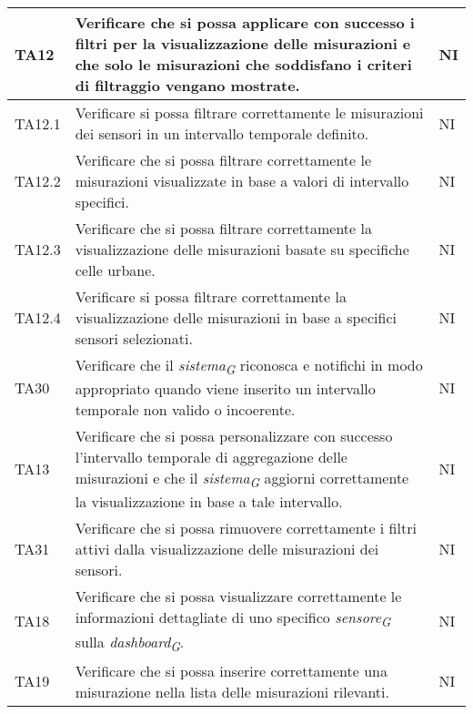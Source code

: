 \begin{longtable}{|C{1.9cm}|L{5cm}|C{2cm}|}
    TA12 & Verificare che si possa applicare con successo i filtri per la visualizzazione delle misurazioni e che solo le misurazioni che soddisfano i criteri di filtraggio vengano mostrate. & NI \\
    \hline
    
    TA12.1 & Verificare si possa filtrare correttamente le misurazioni dei sensori in un intervallo temporale definito. & NI \\
    \hline
    
    TA12.2 & Verificare che si possa filtrare correttamente le misurazioni visualizzate in base a valori di intervallo specifici. & NI \\
    \hline
    
    TA12.3 & Verificare che si possa filtrare correttamente la visualizzazione delle misurazioni basate su specifiche celle urbane. & NI \\
    \hline
    
    TA12.4 & Verificare si possa filtrare correttamente la visualizzazione delle misurazioni in base a specifici sensori selezionati. & NI \\
    \hline
    
    TA30 & Verificare che il \textit{sistema}\textsubscript{\textit{G}} riconosca e notifichi in modo appropriato quando viene inserito un intervallo temporale non valido o incoerente. & NI \\
    \hline
    
    TA13 & Verificare che si possa personalizzare con successo l'intervallo temporale di aggregazione delle misurazioni e che il \textit{sistema}\textsubscript{\textit{G}} aggiorni correttamente la visualizzazione in base a tale intervallo. & NI \\
    \hline
    
    TA31 & Verificare che si possa rimuovere correttamente i filtri attivi dalla visualizzazione delle misurazioni dei sensori. & NI \\
    \hline
    
    TA18 & Verificare che si possa visualizzare correttamente le informazioni dettagliate di uno specifico \textit{sensore}\textsubscript{\textit{G}} sulla \textit{dashboard}\textsubscript{\textit{G}}. & NI \\
    \hline
    
    TA19 & Verificare che si possa inserire correttamente una misurazione nella lista delle misurazioni rilevanti. & NI \\
    \hline
    

\end{longtable}

